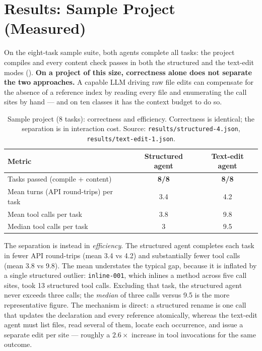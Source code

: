 \section{Results: Sample Project (Measured)}
\label{sec:eval-sample}
On the eight-task sample suite, both agents complete all tasks: the project
compiles and every content check passes in both the structured and the text-edit
modes (). \textbf{On a project of this size,
correctness alone does not separate the two approaches.} A capable LLM driving raw
file edits can compensate for the absence of a reference index by reading every
file and enumerating the call sites by hand --- and on ten classes it has the
context budget to do so.

\begin{table}[t]
  \centering
  \caption{Sample project (8 tasks): correctness and efficiency. Correctness is
  identical; the separation is in interaction cost. Source:
  \texttt{results/structured-4.json}, \texttt{results/text-edit-1.json}.}
  \label{tab:sample-correctness}
  \begin{tabular}{@{}lcc@{}}
    \toprule
    Metric & Structured agent & Text-edit agent \\
    \midrule
    Tasks passed (compile + content) & \textbf{8/8} & \textbf{8/8} \\
    Mean turns (API round-trips) per task     & 3.4 & 4.2 \\
    Mean tool calls per task                  & 3.8 & 9.8 \\
    Median tool calls per task                & 3   & 9.5 \\
    \bottomrule
  \end{tabular}
\end{table}

The separation is instead in \emph{efficiency}. The structured agent completes
each task in fewer API round-trips (mean 3.4 vs 4.2) and substantially fewer tool
calls (mean 3.8 vs 9.8). The mean understates the typical gap, because it is
inflated by a single structured outlier: \texttt{inline-001}, which inlines a
method across five call sites, took 13 structured tool calls. Excluding that task,
the structured agent never exceeds three calls; the \emph{median} of three calls
versus 9.5 is the more representative figure. The mechanism is direct: a
structured rename is one call that updates the declaration and every reference
atomically, whereas the text-edit agent must list files, read several of them,
locate each occurrence, and issue a separate edit per site --- roughly a
$2.6\times$ increase in tool invocations for the same outcome.

